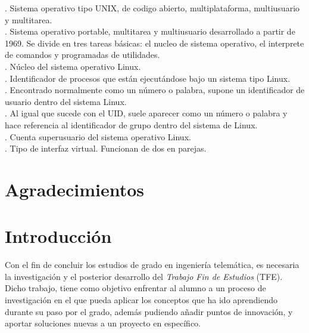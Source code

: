 \documentclass[12pt]{article}
\begin{document}
	. Sistema operativo tipo UNIX, de codigo abierto, multiplataforma, multiusuario y multitarea.\\
	
	. Sistema operativo portable, multitarea y multiusuario desarrollado a partir de 1969. Se divide en tres tareas básicas: el nucleo de sistema operativo, el interprete de comandos y programadas de utilidades.  \\
		 
	. Núcleo del sistema operativo Linux.\\
		 
	. Identificador de procesos que están ejecutándose bajo un sistema tipo Linux.\\
	
	. Encontrado normalmente como un número o palabra, supone un identificador de usuario dentro del sistema Linux.\\
	
	. Al igual que sucede con el UID, suele aparecer como un número o palabra y hace referencia al identificador de grupo dentro del sistema de Linux.\\
		 
	. Cuenta superusuario del sistema operativo Linux.\\
		 
	. Tipo de interfaz virtual. Funcionan de dos en parejas.\\
		 
	
	\pagebreak
	
	\section*{Agradecimientos}
	
	\pagebreak
	
	\section{Introducción}
	\noindent Con el fin de concluir los estudios de grado en ingeniería telemática, es necesaria la investigación y el posterior desarrollo del \textit{Trabajo Fin de Estudios} (TFE). Dicho trabajo, tiene como objetivo enfrentar al alumno a un proceso de investigación en el que pueda aplicar los conceptos que ha ido aprendiendo durante su paso por el grado, además pudiendo añadir puntos de innovación, y aportar soluciones nuevas a un proyecto en específico.\\
	
\end{document}
